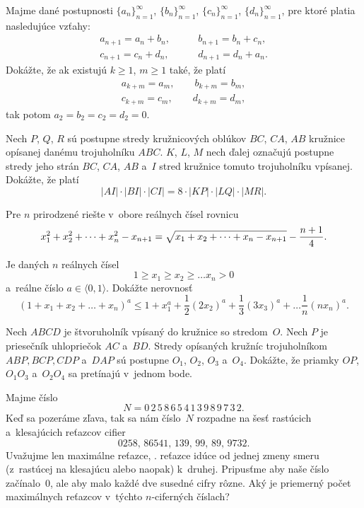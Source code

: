 {%
Majme dané postupnosti $\{a_n\}_{n=1}^\infty$,
$\{b_n\}_{n=1}^\infty$, $\{c_n\}_{n=1}^\infty$, $\{d_n\}_{n=1}^\infty$,
pre ktoré platia nasledujúce vzťahy:
$$
\begin{matrix}
a_{n+1}=a_n+b_n,\qquad& b_{n+1}=b_n+c_n,\\
c_{n+1}=c_n+d_n,\qquad& d_{n+1}=d_n+a_n.
\end{matrix}
$$
Dokážte, že ak existujú $k\geq 1$, $m\geq 1$ také, že platí
$$
\begin{matrix}
a_{k+m}=a_m, \qquad b_{k+m}=b_m,\\
c_{k+m}=c_m, \qquad d_{k+m}=d_m,
\end{matrix}
$$
tak potom $a_2=b_2=c_2=d_2=0$.}

{%
Nech $P$, $Q$, $R$ sú postupne stredy kružnicových oblúkov $BC$, $CA$,
$AB$ kružnice opísanej danému trojuholníku $ABC$. $K$, $L$, $M$ nech ďalej
označujú postupne stredy jeho strán $BC$, $CA$, $AB$ a~$I$ stred kružnice
tomuto trojuholníku vpísanej. Dokážte, že platí
$$|AI|\cdot|BI|\cdot|CI|=8\cdot|KP|\cdot|LQ|\cdot|MR|.$$}

{%
Pre $n$ prirodzené riešte v~obore reálnych čísel rovnicu
$$x_1^2+x_2^2+\dots +x_n^2-x_{n+1}=\sqrt{x_1+x_2+\dots
+x_n-x_{n+1}}-{{n+1}\over 4}.$$}

{%
Je daných $n$ reálnych čísel
$$
  1 \ge x_1 \ge x_2 \ge \dots x_n > 0
$$
a~reálne číslo $a\in\langle0,1\rangle$. Dokážte nerovnosť
$$
  (1 + x_1 + x_2 + \dots + x_n)^a \le
  1 + x_1^a + \frac{1}{2}(2x_2)^a + \frac{1}{3}(3x_3)^a + \dots
  \frac{1}{n}(nx_n)^a.
$$}

{%
Nech $ABCD$ je štvoruholník vpísaný do kružnice so stredom~$O$. Nech
$P$ je priesečník uhlopriečok $AC$ a~$BD$. Stredy opísaných kružníc
trojuholníkom $ABP, BCP, CDP$ a~$DAP$ sú postupne $O_1$, $O_2$, $O_3$ a~$O_4$.
Dokážte, že priamky $OP$, $O_1O_3$ a~$O_2O_4$ sa pretínajú v~jednom bode.}

{%
Majme číslo
$$
  N = 0 \, 2 \,  5 \,  8 \, 6 \, 5  \, 4  \, 1  \, 3  \, 9  \, 8  \,
      9  \, 7  \, 3  \,  2.
$$
Keď sa pozeráme zľava, tak sa nám číslo~$N$ rozpadne na šesť rastúcich a~klesajúcich
reťazcov cifier
$$
  0258,\, 86541, \, 139, \, 99, \, 89, \, 9732.
$$
Uvažujme len maximálne reťazce, \tj. reťazce idúce od jednej zmeny smeru (z~rastúcej
na klesajúcu alebo naopak) k~druhej. Pripusťme aby naše číslo začínalo~0,
ale aby malo každé dve susedné cifry rôzne. Aký je priemerný počet
maximálnych reťazcov v~týchto $n$-ciferných číslach?}

